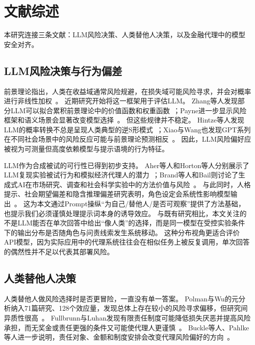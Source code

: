\section{文献综述}

本研究连接三条文献：LLM风险决策、人类替他人决策，以及金融代理中的模型安全对齐。

\subsection{LLM风险决策与行为偏差}

前景理论指出，人类在收益域通常风险规避，在损失域可能风险寻求，并会对概率进行非线性加权~\cite{Kahneman1979Prospect,Tversky1974Judgment}。
近期研究开始将这一框架用于评估LLM。
Zhang等人发现部分LLM可以拟合累积前景理论中的价值函数和权重函数~\cite{Zhang2025Using}；Payne进一步显示风险框架和语义场景会显著改变模型选择~\cite{Payne2025Analysis}。
但这些规律并不稳定。
Hintze等人发现LLM的概率转换不总是呈现人类典型的逆S形模式~\cite{Hintze2025Nonlinear}；Xiao与Wang也发现GPT系列在不同社会场景中的风险反应可能与前景理论预测相反~\cite{Xiao2025Evaluating}。
因此，LLM风险偏好应被视为可测量但高度依赖模型与提示语境的行为特征。

LLM作为合成被试的可行性已得到初步支持。
Aher等人和Horton等人分别展示了LLM复现实验被试行为和模拟经济代理人的潜力~\cite{Aher2023Using,Horton2024Large}；Brand等人和Bail则讨论了生成式AI在市场研究、调查和社会科学实验中的方法价值与风险~\cite{Brand2023Using,Bail2024Can}。
与此同时，人格提示、社会期望偏差和隐含推理偏差研究表明，角色设定会系统性影响模型输出~\cite{Salecha2024LLMs,Jiang2023Evaluating,Gupta2024Bias,Bini2025Behavioral}。
这为本文通过Prompt操纵“为自己/替他人/是否可观察”提供了方法基础，也提示我们必须谨慎处理提示词本身的诱导效应。
与既有研究相比，本文关注的不是LLM能否在单次回答中给出“像人类”的选择，而是同一模型在受控实验条件下的输出分布是否随角色与问责线索发生系统移动。
这种分布视角更适合评价API模型，因为实际应用中的代理系统往往会在相似任务上被反复调用，单次回答的偶然性并不足以代表其部署风险。

\subsection{人类替他人决策}

人类替他人做风险选择时是否更冒险，一直没有单一答案。
Polman与Wu的元分析纳入71篇研究、128个效应量，发现总体上存在较小的风险寻求偏移，但研究间异质性很高~\cite{Polman2020Decision}。
Fullbrunn与Luhan发现有限责任制度可能降低损失厌恶并提高风险承担，而无奖金或责任更强的条件又可能使代理人更谨慎~\cite{Fullbrunn2017Decision,Fullbrunn2019Responsibility}。
Buckle等人、Pahlke等人进一步说明，责任对象、金额和制度安排会改变代理风险偏好的方向~\cite{Buckle2024Needs,Pahlke2015Responsibility}。

